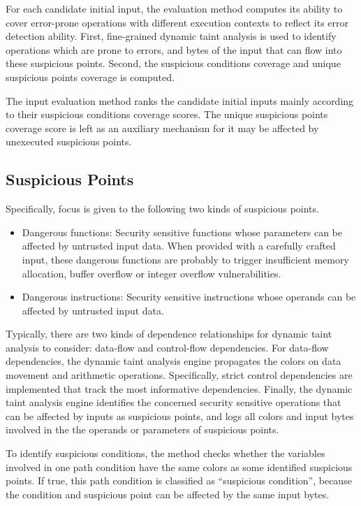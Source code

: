For each candidate initial input, the evaluation method computes its ability to cover error-prone operations with different execution contexts to reflect its error detection ability. 
First, fine-grained dynamic taint analysis is used to identify operations which are prone to errors, and bytes of the input that can flow into these suspicious points.
Second, the suspicious conditions coverage and unique suspicious points coverage is computed.

The input evaluation method ranks the candidate initial inputs mainly according to their suspicious conditions coverage scores. 
The unique suspicious points coverage score is left as an auxiliary mechanism for it may be affected by unexecuted suspicious points.

\subsection{Suspicious Points}
Specifically, focus is given to the following two kinds of suspicious points. 
\begin{itemize}
    \item Dangerous functions: Security sensitive functions whose parameters can be affected by untrusted input data.
    When provided with a carefully crafted input, these dangerous functions are probably to trigger insufficient memory allocation, buffer overflow or integer overflow vulnerabilities.
    \item Dangerous instructions: Security sensitive instructions whose operands can be affected by untrusted input data.
\end{itemize}

Typically, there are two kinds of dependence relationships for dynamic taint analysis to consider: data-flow and control-flow dependencies. 
For data-flow dependencies, the dynamic taint analysis engine propagates the colors on data movement and arithmetic operations.
Specifically, strict control dependencies are implemented that track the most informative dependencies.
Finally, the dynamic taint analysis engine identifies the concerned security sensitive operations that can be affected by inputs as suspicious points, and logs all colors and input bytes involved in the the operands or parameters of suspicious points.

To identify suspicious conditions, the method checks whether the variables involved in one path condition have the same colors as some identified suspicious points. If true, this path condition is classified as ``suspicious condition'', because the condition and suspicious point can be affected by the same input bytes.

